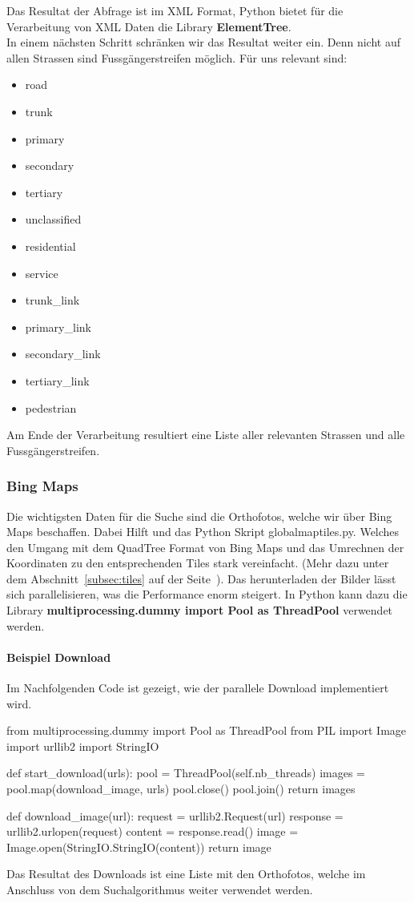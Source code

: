 Das Resultat der Abfrage ist im XML Format, Python bietet für die Verarbeitung von XML Daten die Library \textbf{ElementTree}.\\
In einem nächsten Schritt schränken wir das Resultat weiter ein. Denn nicht auf allen Strassen sind Fussgängerstreifen möglich. Für uns relevant sind:
\begin{itemize}
	\item road
	\item trunk
	\item primary
	\item secondary 
	\item tertiary
	\item unclassified
	\item residential
	\item service 
	\item trunk\_link 
	\item primary\_link 
	\item secondary\_link 
	\item tertiary\_link 
	\item pedestrian
\end{itemize}

Am Ende der Verarbeitung resultiert eine Liste aller relevanten Strassen und alle Fussgängerstreifen.

\subsubsection{Bing Maps}
Die wichtigsten Daten für die Suche sind die Orthofotos, welche wir über Bing Maps beschaffen. Dabei Hilft und das Python Skript globalmaptiles.py. Welches den Umgang mit dem QuadTree Format von Bing Maps und das Umrechnen der Koordinaten zu den entsprechenden Tiles stark vereinfacht. (Mehr dazu unter dem Abschnitt~\ref{subsec:tiles} auf der Seite~\pageref{subsec:tiles}). Das herunterladen der Bilder lässt sich parallelisieren, was die Performance enorm steigert. In Python kann dazu die Library \textbf{multiprocessing.dummy import Pool as ThreadPool} verwendet werden.

\paragraph{Beispiel Download} Im Nachfolgenden Code ist gezeigt, wie der parallele Download implementiert wird. \\
\begin{python}
from multiprocessing.dummy import Pool as ThreadPool
from PIL import Image
import urllib2
import StringIO

def start_download(urls):
     pool = ThreadPool(self.nb_threads)       
     images = pool.map(download_image, urls)
     pool.close()
     pool.join()
     return images

def download_image(url):
    request = urllib2.Request(url)
    response = urllib2.urlopen(request)
    content = response.read()
    image = Image.open(StringIO.StringIO(content))
    return image

\end{python}

Das Resultat des Downloads ist eine Liste mit den Orthofotos, welche im Anschluss von dem Suchalgorithmus weiter verwendet werden.



